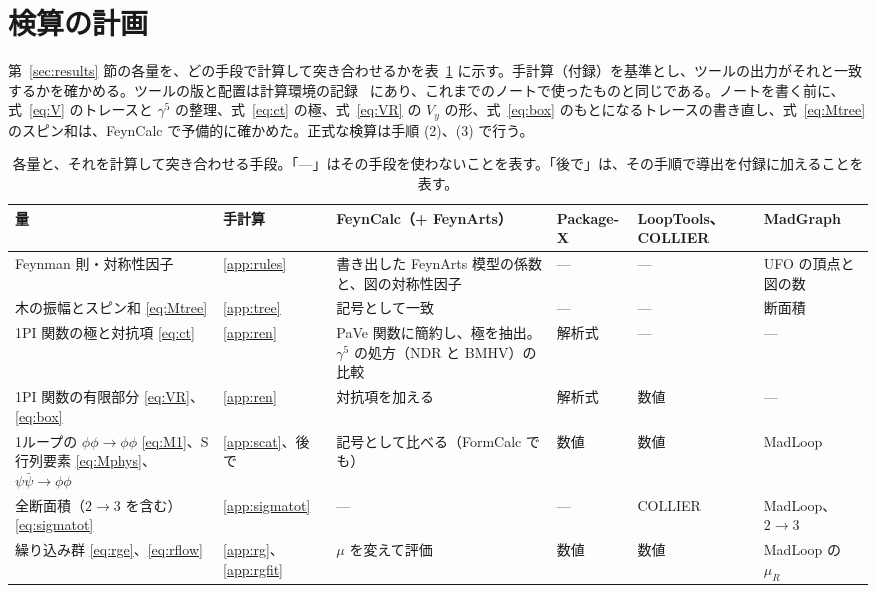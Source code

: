 \documentclass[a4paper,10pt]{ltjsarticle}
\begin{document}
\section{検算の計画}\label{sec:plan}

第~\ref{sec:results} 節の各量を、どの手段で計算して突き合わせるかを表~\ref{tab:plan} に示す。手計算（付録）を基準とし、ツールの出力がそれと一致するかを確かめる。ツールの版と配置は計算環境の記録~\cite{env} にあり、これまでのノートで使ったものと同じである。ノートを書く前に、式~\eqref{eq:V} のトレースと $\gamma^5$ の整理、式~\eqref{eq:ct} の極、式~\eqref{eq:VR} の $V_y$ の形、式~\eqref{eq:box} のもとになるトレースの書き直し、式~\eqref{eq:Mtree} のスピン和は、FeynCalc で予備的に確かめた。正式な検算は手順 (2)、(3) で行う。

\begin{table}[tbp]
\centering\small
\caption{各量と、それを計算して突き合わせる手段。「—」はその手段を使わないことを表す。「後で」は、その手順で導出を付録に加えることを表す。}
\label{tab:plan}
\begin{tabularx}{\linewidth}{>{\raggedright\arraybackslash}p{3.4cm}>{\raggedright\arraybackslash}p{1.5cm}>{\raggedright\arraybackslash}X>{\raggedright\arraybackslash}p{1.8cm}>{\raggedright\arraybackslash}p{1.7cm}>{\raggedright\arraybackslash}p{2.0cm}}
\toprule
\textbf{量} & \textbf{手計算} & \textbf{FeynCalc（+ FeynArts）} & \textbf{Package-X} & \textbf{LoopTools、COLLIER} & \textbf{MadGraph} \\
\midrule
Feynman 則・対称性因子 & \ref{app:rules} & 書き出した FeynArts 模型の係数と、図の対称性因子 & — & — & UFO の頂点と図の数 \\
木の振幅とスピン和 \eqref{eq:Mtree} & \ref{app:tree} & 記号として一致 & — & — & 断面積 \\
1PI 関数の極と対抗項 \eqref{eq:ct} & \ref{app:ren} & PaVe 関数に簡約し、極を抽出。$\gamma^5$ の処方（NDR と BMHV）の比較 & 解析式 & — & — \\
1PI 関数の有限部分 \eqref{eq:VR}、\eqref{eq:box} & \ref{app:ren} & 対抗項を加える & 解析式 & 数値 & — \\
1ループの $\phi\phi\to\phi\phi$ \eqref{eq:M1}、S 行列要素 \eqref{eq:Mphys}、$\psi\bar\psi\to\phi\phi$ & \ref{app:scat}、後で & 記号として比べる（FormCalc でも） & 数値 & 数値 & MadLoop \\
全断面積（$2\to3$ を含む）\eqref{eq:sigmatot} & \ref{app:sigmatot} & — & — & COLLIER & MadLoop、$2\to3$ \\
繰り込み群 \eqref{eq:rge}、\eqref{eq:rflow} & \ref{app:rg}、\ref{app:rgfit} & $\mu$ を変えて評価 & 数値 & 数値 & MadLoop の $\mu_R$ \\

\end{tabularx}
\end{table}
\end{document}
